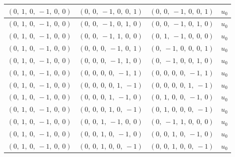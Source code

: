 \documentclass[11pt]{article}
\theoremstyle{definition}
\begin{document}
\begin{longtable}{|l|l|l|c|}
    \hline
    $\left( 0, \  1, \  0, \  -1, \  0, \  0\right)$ & $\left( 0, \  0, \  -1, \  0, \  0, \  1\right)$ & $\left( 0, \  0, \  -1, \  0, \  0, \  1\right)$ & $u_{0}$ \\
    \hline
    $\left( 0, \  1, \  0, \  -1, \  0, \  0\right)$ & $\left( 0, \  0, \  -1, \  0, \  1, \  0\right)$ & $\left( 0, \  0, \  -1, \  0, \  1, \  0\right)$ & $u_{0}$ \\
    \hline
    $\left( 0, \  1, \  0, \  -1, \  0, \  0\right)$ & $\left( 0, \  0, \  -1, \  1, \  0, \  0\right)$ & $\left( 0, \  1, \  -1, \  0, \  0, \  0\right)$ & $u_{0}$ \\
    \hline
    $\left( 0, \  1, \  0, \  -1, \  0, \  0\right)$ & $\left( 0, \  0, \  0, \  -1, \  0, \  1\right)$ & $\left( 0, \  -1, \  0, \  0, \  0, \  1\right)$ & $u_{0}$ \\
    \hline
    $\left( 0, \  1, \  0, \  -1, \  0, \  0\right)$ & $\left( 0, \  0, \  0, \  -1, \  1, \  0\right)$ & $\left( 0, \  -1, \  0, \  0, \  1, \  0\right)$ & $u_{0}$ \\
    \hline
    $\left( 0, \  1, \  0, \  -1, \  0, \  0\right)$ & $\left( 0, \  0, \  0, \  0, \  -1, \  1\right)$ & $\left( 0, \  0, \  0, \  0, \  -1, \  1\right)$ & $u_{0}$ \\
    \hline
    $\left( 0, \  1, \  0, \  -1, \  0, \  0\right)$ & $\left( 0, \  0, \  0, \  0, \  1, \  -1\right)$ & $\left( 0, \  0, \  0, \  0, \  1, \  -1\right)$ & $u_{0}$ \\
    \hline
    $\left( 0, \  1, \  0, \  -1, \  0, \  0\right)$ & $\left( 0, \  0, \  0, \  1, \  -1, \  0\right)$ & $\left( 0, \  1, \  0, \  0, \  -1, \  0\right)$ & $u_{0}$ \\
    \hline
    $\left( 0, \  1, \  0, \  -1, \  0, \  0\right)$ & $\left( 0, \  0, \  0, \  1, \  0, \  -1\right)$ & $\left( 0, \  1, \  0, \  0, \  0, \  -1\right)$ & $u_{0}$ \\
    \hline
    $\left( 0, \  1, \  0, \  -1, \  0, \  0\right)$ & $\left( 0, \  0, \  1, \  -1, \  0, \  0\right)$ & $\left( 0, \  -1, \  1, \  0, \  0, \  0\right)$ & $u_{0}$ \\
    \hline
    $\left( 0, \  1, \  0, \  -1, \  0, \  0\right)$ & $\left( 0, \  0, \  1, \  0, \  -1, \  0\right)$ & $\left( 0, \  0, \  1, \  0, \  -1, \  0\right)$ & $u_{0}$ \\
    \hline
    $\left( 0, \  1, \  0, \  -1, \  0, \  0\right)$ & $\left( 0, \  0, \  1, \  0, \  0, \  -1\right)$ & $\left( 0, \  0, \  1, \  0, \  0, \  -1\right)$ & $u_{0}$ \\

\end{longtable}
\end{document}
